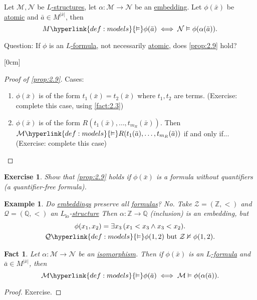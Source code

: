 \documentclass{article}
\let\models\vDash
\let\nModels\nvDash
\newtheorem{nexample}[nthm]{Example}
\newtheorem{nexercise}[nthm]{Exercise}
\newtheorem{nfact}[nthm]{Fact}
\begin{document}
\begin{nprop}\label{prop:2.9}
  Let $\mathcal{M}, \mathcal{N}$ be \hyperlink{def:lstr}{$L$-structures}, let $\alpha: \mathcal{M} \to \mathcal{N}$ be an \hyperlink{def:embedding}{embedding}.
  Let $\phi(\bar{x})$ be \hyperlink{def:atomform}{atomic} and $\bar{a} \in M^{|\bar{x}|}$, then
  \begin{equation*}
    M \hyperlink{def:models}{\models} \phi(\bar{a}) \iff \mathcal{N} \models \phi(\alpha(\bar{a})).
  \end{equation*}
\end{nprop}

Question: If $\phi$ is an \hyperlink{def:form}{$L$-formula}, not necessarily \hyperlink{def:atomform}{atomic}, does \cref{prop:2.9} hold?

[0cm]
\begin{proof}[Proof of \cref{prop:2.9}]
  Cases:
  \begin{enumerate}[label=(\roman*)]
    \item $\phi(\bar{x})$ is of the form $t_1(\bar{x}) = t_2(\bar{x})$ where $t_1,t_2$ are terms.
      (Exercise: complete this case, using \cref{fact:2.3})
    \item $\phi(\bar{x})$ is of the form $R(t_1(\bar{x}), \dotsc, t_{m_R}(\bar{x}))$.
      Then $\mathcal{M} \hyperlink{def:models}{\models} R(t_1(\bar{a}), \dotsc, t_{m_R}(\bar{a}))$ if and only if...
      (Exercise: complete this case)
  \end{enumerate}
\end{proof}
\begin{nexercise}\label{ex:2.10}
  Show that \cref{prop:2.9} holds if $\phi(\bar{x})$ is a formula without quantifiers (a quantifier-free formula).
\end{nexercise}
\begin{nexample}\label{ex:2.11}
  Do \hyperlink{def:embedding}{embeddings} preserve \emph{all} \hyperlink{def:form}{formulas}? No.
  Take $\mathcal{Z} = (\mathbb{Z}, <)$ and $\mathcal{Q} = (\mathbb{Q}, <)$ an \hyperlink{def:lgp}{$L_{\text{lo}}$}-\hyperlink{def:lstr}{structure}
  Then $\alpha: \mathbb{Z} \to \mathbb{Q}$ (inclusion) is an embedding, but
  \begin{gather*}
    \phi(x_1, x_2) = \exists x_3\,(x_1 < x_3 \wedge x_3 < x_2). \\
    \mathcal{Q} \hyperlink{def:models}{\models} \phi(1,2) \text{ but } \mathcal{Z} \nModels \phi(1,2).
  \end{gather*}
\end{nexample}
\begin{nfact}\label{fact:2.12}
  Let $\alpha: \mathcal{M} \to \mathcal{N}$ be an \hyperlink{def:iso}{isomorphism}.
  Then if $\phi(\bar{x})$ is an \hyperlink{def:form}{$L$-formula} and $\bar{a} \in M^{|\bar{x}|}$, then
  \begin{equation*}
    \mathcal{M} \hyperlink{def:models}{\models} \phi(\bar{a}) \iff \mathcal{M} \models \phi(\alpha(\bar{a})).
  \end{equation*}
\end{nfact}
\begin{proof}
  Exercise.
\end{proof}
\end{document}
